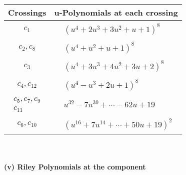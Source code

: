 \documentclass[1p]{elsarticle_modified}
\theoremstyle{definition}
\begin{document}
\begin{tabular}{m{50pt}|m{274pt}}
Crossings & \hspace{64pt}u-Polynomials at each crossing \\
\hline $$\begin{aligned}c_{1}\end{aligned}$$&$\begin{aligned}
&(u^4+2 u^3+3 u^2+u+1)^8
\end{aligned}$\\
\hline $$\begin{aligned}c_{2},c_{8}\end{aligned}$$&$\begin{aligned}
&(u^4+u^2+u+1)^8
\end{aligned}$\\
\hline $$\begin{aligned}c_{3}\end{aligned}$$&$\begin{aligned}
&(u^4+3 u^3+4 u^2+3 u+2)^8
\end{aligned}$\\
\hline $$\begin{aligned}c_{4},c_{12}\end{aligned}$$&$\begin{aligned}
&(u^4- u^3+2 u+1)^8
\end{aligned}$\\
\hline $$\begin{aligned}c_{5},c_{7},c_{9}\\c_{11}\end{aligned}$$&$\begin{aligned}
&u^{32}-7 u^{30}+\cdots-62 u+19
\end{aligned}$\\
\hline $$\begin{aligned}c_{6},c_{10}\end{aligned}$$&$\begin{aligned}
&(u^{16}+7 u^{14}+\cdots+50 u+19)^{2}
\end{aligned}$\\
\hline
\end{tabular}\\~\\
\newpage\renewcommand{\arraystretch}{1}
\flushleft \textbf{(v) Riley Polynomials at the component}\newline \\
\end{document}
